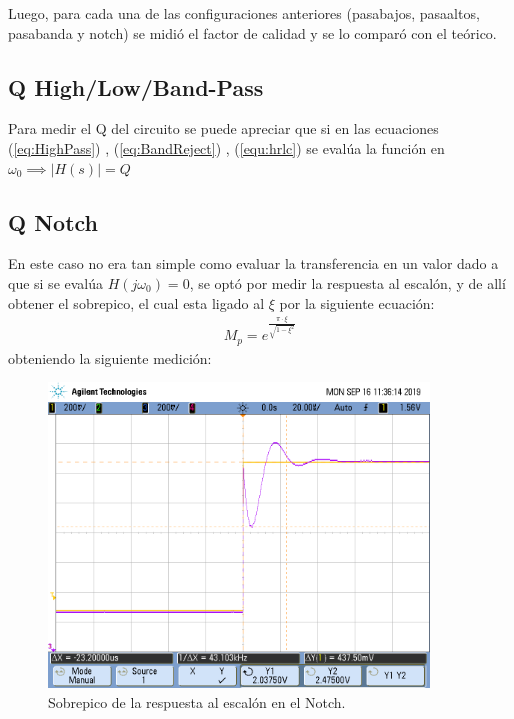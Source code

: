 Luego, para cada una de las configuraciones anteriores (pasabajos, pasaaltos, pasabanda y notch) se midió el factor de calidad y se lo comparó con el teórico.
\subsection{Q High/Low/Band-Pass}
Para medir el Q del circuito se puede apreciar que si en las ecuaciones (\ref{eq:HighPass}) , (\ref{eq:BandReject}) , (\ref{equ:hrlc}) se evalúa la función en $\omega_0 \implies |H(s)|=Q$

\subsection{Q Notch}
En este caso no era tan simple como evaluar la transferencia en un valor dado a que si se evalúa $H(j\omega_0)=0$, se optó por medir la respuesta al escalón, y de allí obtener el sobrepico, el cual esta ligado al $\xi$ por la siguiente ecuación:
\begin{align}M_p = e^{\frac{\pi \cdot \xi}{\sqrt{1-\xi^2}}} \end{align}
obteniendo la siguiente medición:
\begin{figure}[H]
	\centering
	\includegraphics[width=0.9\textwidth]{Mediciones_pendrive_alan/scope_1.png}
\caption{Sobrepico de la respuesta al escalón en el Notch.}
	\label{fig:Overshoot5}
\end{figure}


